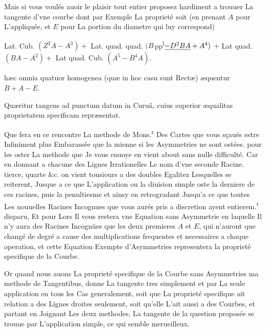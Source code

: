 \documentclass[11pt,a4paper]{article}
\begin{document}
Mais si vous voulés auoir le plaisir tout entier proposez hardiment a trouuer La tangente d'vne courbe dont par Exemple La proprieté soit (en prenant $A$ pour L'appliquée, et $E$ pour La portion du diametre qui luy correspond)

Lat. Cub. $(Z^2A - A^3) +$ Lat. quad. quad. $(B\,$pp\textsuperscript{l}$\uncertain{- D^2BA} + A^4)$ $+$ Lat quad. $(BA - A^2) +$ Lat quad. Cub. $(A^5 - B^4A)$.

hæc omnia quatuor homogenea (quæ in hoc casu sunt Rectæ) æquentur $B + A - E$.

Quæritur tangens ad punctum datum in Curuâ, cuius superior æqualitas proprietatem specificam repræsentat.


Que fera en ce rencontre La methode de Mons.\textsuperscript{r} Des Cartes que vous sçauës estre Infiniment plus Embarassée que la mienne si les Asymmetries ne sont ostées. pour les oster La methode que Je vous enuoye en vient about sans nulle difficulté. Car en donnant a chacune des Lignes Irrationelles Le nom d'vne seconde Racine. tierce, quarte \&c. on vient tousiours a des doubles Egalitez Lesquelles se reiterent, Jusque a ce que L'application ou la diuision simple oste la derniere de ces racines, puis la penultiesme et ainsy en retrogradant Jusqu'a ce que toutes Les nouuelles Racines Incognues que vous aurés pris a discretion ayent entierem.\textsuperscript{t} disparu, Et pour Lors Il vous restera vne Equation sans Asymmetrie en laquelle Il n'y aura des Racines Incognües que les deux premieres $A$ et $E$, qui n'auront que changé de degré a cause des multiplications frequentes et necessaires a chaque operation, et cette Equation Exempte d'Asymmetries representera la proprieté specifique de la Courbe.

Or quand nous auons La proprieté specifique de la Courbe sans Asymmetries ma methode de Tangentibus, donne La tangente tres simplement et par La seule application en tous les Cas generalement, soit que La proprieté specifique ait relation a des Lignes droites seulement, soit qu'elle L'ait aussi a des Courbes, et partant en Joignant Les deux methodes, La tangente de la question proposée se trouue par L'application simple, ce qui semble merueilleux.
\end{document}
